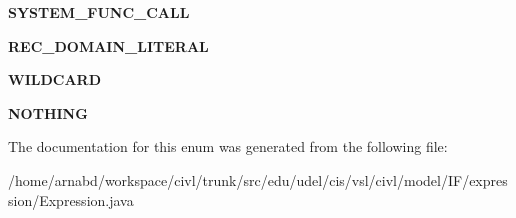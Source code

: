 \begin{DoxyCompactItemize}
\item 
\hypertarget{enumedu_1_1udel_1_1cis_1_1vsl_1_1civl_1_1model_1_1IF_1_1expression_1_1Expression_1_1ExpressionKind_a062556fac02a29ff3dd38c93f00cfbf2}{}{\bfseries S\+Y\+S\+T\+E\+M\+\_\+\+F\+U\+N\+C\+\_\+\+C\+A\+L\+L}\label{enumedu_1_1udel_1_1cis_1_1vsl_1_1civl_1_1model_1_1IF_1_1expression_1_1Expression_1_1ExpressionKind_a062556fac02a29ff3dd38c93f00cfbf2}

\item 
\hypertarget{enumedu_1_1udel_1_1cis_1_1vsl_1_1civl_1_1model_1_1IF_1_1expression_1_1Expression_1_1ExpressionKind_a716fa127ef8798487f0181a36a5a4e1c}{}{\bfseries R\+E\+C\+\_\+\+D\+O\+M\+A\+I\+N\+\_\+\+L\+I\+T\+E\+R\+A\+L}\label{enumedu_1_1udel_1_1cis_1_1vsl_1_1civl_1_1model_1_1IF_1_1expression_1_1Expression_1_1ExpressionKind_a716fa127ef8798487f0181a36a5a4e1c}

\item 
\hypertarget{enumedu_1_1udel_1_1cis_1_1vsl_1_1civl_1_1model_1_1IF_1_1expression_1_1Expression_1_1ExpressionKind_ae01aa9e602e62172b440a171355b8a3a}{}{\bfseries W\+I\+L\+D\+C\+A\+R\+D}\label{enumedu_1_1udel_1_1cis_1_1vsl_1_1civl_1_1model_1_1IF_1_1expression_1_1Expression_1_1ExpressionKind_ae01aa9e602e62172b440a171355b8a3a}

\item 
\hypertarget{enumedu_1_1udel_1_1cis_1_1vsl_1_1civl_1_1model_1_1IF_1_1expression_1_1Expression_1_1ExpressionKind_a6b8959bde0526fa1dc268400c787dbeb}{}{\bfseries N\+O\+T\+H\+I\+N\+G}\label{enumedu_1_1udel_1_1cis_1_1vsl_1_1civl_1_1model_1_1IF_1_1expression_1_1Expression_1_1ExpressionKind_a6b8959bde0526fa1dc268400c787dbeb}

\end{DoxyCompactItemize}


The documentation for this enum was generated from the following file\+:\begin{DoxyCompactItemize}
\item 
/home/arnabd/workspace/civl/trunk/src/edu/udel/cis/vsl/civl/model/\+I\+F/expression/Expression.\+java\end{DoxyCompactItemize}
